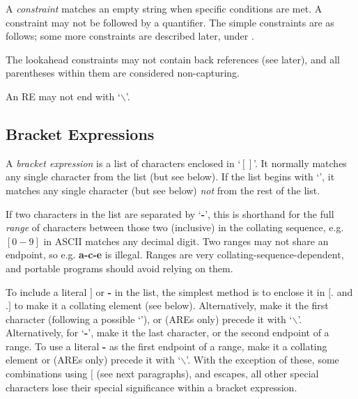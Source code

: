 A {\it constraint} matches an empty string when specific conditions are met. A constraint may
not be followed by a quantifier. The simple constraints are as follows;
some more constraints are described later, under .

\begin{twocollist}\twocolwidtha{4cm}
\end{twocollist}

The lookahead constraints may not contain back references
(see later), and all parentheses within them are considered non-capturing.

An RE may not end with `{\bf $\backslash$}'.

\subsection{Bracket Expressions}\label{wxresynbracket}


A {\it bracket expression} is a list
of characters enclosed in `{\bf $[]$}'. It normally matches any single character from
the list (but see below). If the list begins with `{\bf \caret}', it matches any single
character (but see below) {\it not} from the rest of the list. 

If two characters
in the list are separated by `{\bf -}', this is shorthand for the full {\it range} of
characters between those two (inclusive) in the collating sequence, e.g.
 {\bf $[0-9]$} in ASCII matches any decimal digit. Two ranges may not share an endpoint,
so e.g. {\bf a-c-e} is illegal. Ranges are very collating-sequence-dependent, and portable
programs should avoid relying on them. 

To include a literal {\bf $]$} or {\bf -} in the
list, the simplest method is to enclose it in {\bf $[.$} and {\bf $.]$} to make it a collating
element (see below). Alternatively, make it the first character (following
a possible `{\bf \caret}'), or (AREs only) precede it with `{\bf $\backslash$}'.
Alternatively, for `{\bf -}', make
it the last character, or the second endpoint of a range. To use a literal
 {\bf -} as the first endpoint of a range, make it a collating element or (AREs
only) precede it with `{\bf $\backslash$}'. With the exception of these, some combinations using
 {\bf $[$} (see next paragraphs), and escapes, all other special characters lose
their special significance within a bracket expression. 

